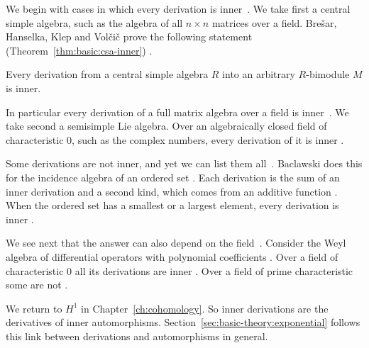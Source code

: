 We begin with cases in which every derivation is inner~\cite[Corollary~6.2]{BresarHanselkaKlepVolcic2018}. We take first a central
simple algebra, such as the algebra of all $n \times n$ matrices over a field.
Brešar, Hanselka, Klep and Volčič prove the following statement (Theorem~\ref{thm:basic:csa-inner})
\cite[Corollary~6.2]{BresarHanselkaKlepVolcic2018}.\begin{theorem}\label{thm:basic:csa-inner}
Every derivation from a central simple algebra $R$ into an arbitrary $R$-bimodule
$M$ is inner.
\end{theorem}

In particular every derivation of a full matrix algebra over a field is inner~\cite[\S5.3, p.~23]{Humphreys1972}.
We take second a semisimple Lie algebra. Over an algebraically closed field of
characteristic $0$, such as the complex numbers, every derivation of it is
inner \cite[\S5.3, p.~23]{Humphreys1972}.

Some derivations are not inner, and yet we can list them all~\cite[p.~354]{Baclawski1972}. Baclawski does
this for the incidence algebra of an ordered set \cite[p.~351]{Baclawski1972}.
Each derivation is the sum of an inner derivation and a second kind, which
comes from an additive function \cite[Theorem~2, p.~353]{Baclawski1972}. When
the ordered set has a smallest or a largest element, every derivation is inner
\cite[p.~354]{Baclawski1972}.

We see next that the answer can also depend on the field~\cite[p.~48]{BenkartLopesOndrus2015}. Consider the Weyl
algebra of differential operators with polynomial coefficients
\cite[p.~46]{BenkartLopesOndrus2015}. Over a field of characteristic $0$ all
its derivations are inner \cite[p.~48]{BenkartLopesOndrus2015}. Over a field
of prime characteristic some are not \cite[p.~48]{BenkartLopesOndrus2015}.

We return to $H^1$ in Chapter~\ref{ch:cohomology}. So inner derivations are
the derivatives of inner automorphisms.
Section~\ref{sec:basic-theory:exponential} follows this link between
derivations and automorphisms in general.
